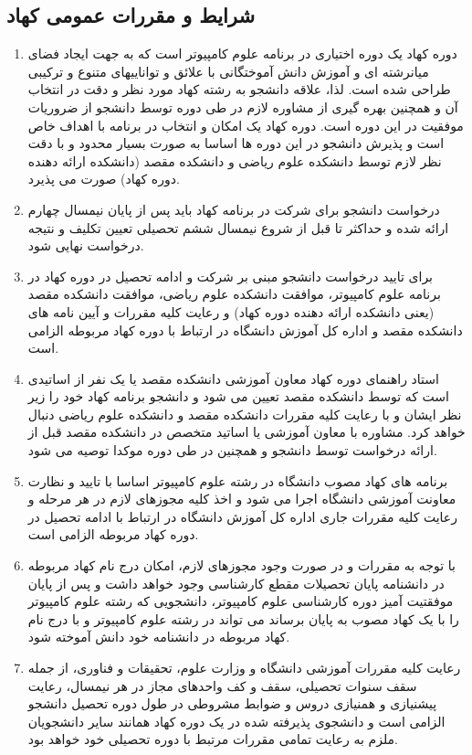 \documentclass{article}
\begin{document}
\subsection{
شرایط و مقررات عمومی کهاد
}
\begin{enumerate}
    \item
     دوره کهاد یک دوره اختیاری در برنامه علوم کامپیوتر است که به جهت ایجاد فضای میانرشته ای و آموزش دانش آموختگانی با علائق و تواناییهای متنوع و ترکیبی طراحی شده است. لذا، علاقه دانشجو به رشته کهاد مورد نظر و دقت در انتخاب آن و همچنین بهره گیری از مشاوره لازم در طی دوره توسط دانشجو از ضروریات موفقیت در این دوره است. دوره کهاد یک امکان و انتخاب در برنامه با اهداف خاص است و پذیرش دانشجو در این دوره ها اساسا به صورت بسیار محدود و با دقت نظر لازم توسط دانشکده علوم ریاضی و دانشکده مقصد (دانشکده ارائه دهنده دوره کهاد) صورت می پذیرد.
	\item
	 درخواست دانشجو برای شرکت در برنامه کهاد باید پس از پایان نیمسال چهارم ارائه شده و حداکثر تا قبل از شروع نیمسال ششم تحصیلی تعیین تکلیف و نتیجه درخواست نهایی شود.
	\item
	 برای تایید درخواست دانشجو مبنی بر شرکت و ادامه تحصیل در دوره کهاد در برنامه علوم کامپیوتر، موافقت دانشکده علوم ریاضی، موافقت دانشکده مقصد (یعنی دانشکده ارائه دهنده دوره کهاد) و رعایت کلیه مقررات و آیین نامه های دانشکده مقصد و اداره کل آموزش دانشگاه در ارتباط با دوره کهاد مربوطه الزامی است.
	\item
	 استاد راهنمای دوره کهاد معاون آموزشی دانشکده مقصد یا یک نفر از اساتیدی است که توسط دانشکده مقصد تعیین می شود و دانشجو برنامه کهاد خود را زیر نظر ایشان و با رعایت کلیه مقررات دانشکده مقصد و دانشکده علوم ریاضی دنبال خواهد کرد. مشاوره با معاون آموزشی یا اساتید متخصص در دانشکده مقصد قبل از ارائه درخواست توسط دانشجو و همچنین در طی دوره موکدا توصیه می شود.
	\item
	 برنامه های کهاد مصوب دانشگاه در رشته علوم کامپیوتر اساسا با تایید و نظارت معاونت آموزشی دانشگاه اجرا می شود و اخذ کلیه مجوزهای لازم در هر مرحله و رعایت کلیه مقررات جاری اداره کل آموزش دانشگاه در ارتباط با ادامه تحصیل در دوره کهاد مربوطه الزامی است.
	\item
	 با توجه به مقررات و در صورت وجود مجوزهای لازم، امکان درج نام کهاد مربوطه در دانشنامه پایان تحصیلات مقطع کارشناسی وجود خواهد داشت و پس از پایان موفقتیت آمیز دوره کارشناسی علوم کامپیوتر، دانشجویی که رشته علوم کامپیوتر را با یک کهاد مصوب به پایان برساند می تواند در رشته علوم کامپیوتر و با درج نام کهاد مربوطه در دانشنامه خود دانش آموخته شود.
	\item
	 رعایت کلیه مقررات آموزشی دانشگاه و وزارت علوم، تحقیقات و فناوری، از جمله سقف سنوات تحصیلی، سقف و کف واحدهای مجاز در هر نیمسال، رعایت پیشنیازی و همنیازی دروس و ضوابط مشروطی در طول دوره تحصیل دانشجو الزامی است و دانشجوی پذیرفته شده در یک دوره کهاد همانند سایر دانشجویان ملزم به رعایت تمامی مقررات مرتبط با دوره تحصیلی خود خواهد بود.
\end{enumerate}
\end{document}
